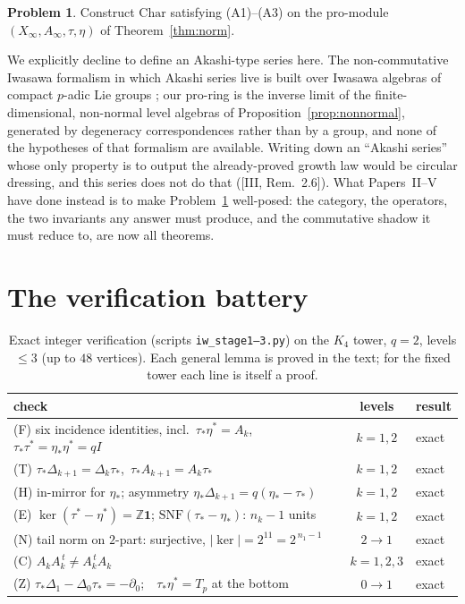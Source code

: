 \documentclass[11pt]{amsart}
\numberwithin{equation}{section}
\theoremstyle{definition}
\newtheorem{problem}[theorem]{Problem}
\theoremstyle{remark}
\newcommand{\Z}{\mathbb{Z}}
\newcommand{\ta}{\tau_*}
\newcommand{\taup}{\tau^*}
\newcommand{\et}{\eta_*}
\newcommand{\etp}{\eta^*}
\begin{document}
\begin{problem}\label{prob:char}
Construct $\mathrm{Char}$ satisfying (A1)--(A3) on the pro-module
$(X_\infty,A_\infty,\tau,\eta)$ of Theorem~\ref{thm:norm}.
\end{problem}

We explicitly decline to define an Akashi-type series here. The non-commutative
Iwasawa formalism in which Akashi series live is built over Iwasawa algebras of
compact $p$-adic Lie groups \cite{CFKSV}; our pro-ring is the inverse limit of the
finite-dimensional, non-normal level algebras of
Proposition~\ref{prop:nonnormal}, generated by degeneracy correspondences rather
than by a group, and none of the hypotheses of that formalism are available. Writing
down an ``Akashi series'' whose only property is to output the already-proved growth
law would be circular dressing, and this series does not do that
([III, Rem.~2.6]). What Papers~II--V have done instead is to make
Problem~\ref{prob:char} well-posed: the category, the operators, the two invariants
any answer must produce, and the commutative shadow it must reduce to, are now all
theorems.

\section{The verification battery}\label{sec:battery}

\begin{table}[ht]
\centering\small
\renewcommand{\arraystretch}{1.2}
\begin{tabular}{lcl}
\toprule
check & levels & result\\
\midrule
(F) six incidence identities, incl.\ $\ta\etp=A_k$, $\ta\taup=\et\etp=qI$ & $k=1,2$ & exact\\
(T) $\ta\Delta_{k+1}=\Delta_k\ta$,\ $\ta A_{k+1}=A_k\ta$ & $k=1,2$ & exact\\
(H) in-mirror for $\et$; asymmetry $\et\Delta_{k+1}=q(\et-\ta)$ & $k=1,2$ & exact\\
(E) $\ker(\taup-\etp)=\Z\mathbf1$; $\mathrm{SNF}(\ta-\et)$: $n_k{-}1$ units & $k=1,2$ & exact\\
(N) tail norm on $2$-part: surjective, $|\ker|=2^{11}=2^{\,n_1-1}$ & $2\to1$ & exact\\
(C) $A_kA_k^{\,t}\neq A_k^{\,t}A_k$ & $k=1,2,3$ & exact\\
(Z) $\ta\Delta_1-\Delta_0\ta=-\partial_0$;\ \ $\ta\etp=T_p$ at the bottom & $0\to1$ & exact\\
\bottomrule
\end{tabular}
\medskip
\caption{Exact integer verification (scripts \texttt{iw\_stage1--3.py}) on the $K_4$
tower, $q=2$, levels $\le3$ (up to $48$ vertices). Each general lemma is proved in
the text; for the fixed tower each line is itself a proof.}
\label{tab:battery}
\end{table}
\end{document}
